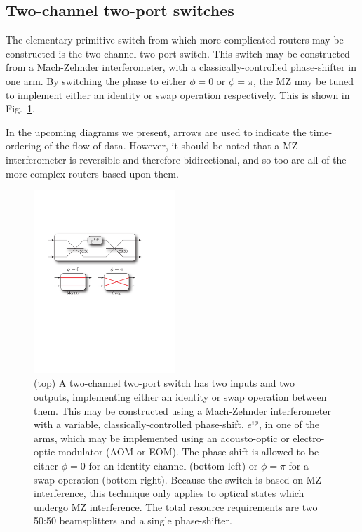 %
%

\subsection{Two-channel two-port switches} 

The elementary primitive switch from which more complicated routers may be constructed is the two-channel two-port switch. This switch may be constructed from a Mach-Zehnder interferometer, with a classically-controlled phase-shifter in one arm. By switching the phase to either \mbox{$\phi=0$} or \mbox{$\phi=\pi$}, the MZ may be tuned to implement either an identity or swap operation respectively. This is shown in Fig.~\ref{fig:two_channel_two_port_switch}.

In the upcoming diagrams we present, arrows are used to indicate the time-ordering of the flow of data. However, it should be noted that a MZ interferometer is reversible and therefore bidirectional, and so too are all of the more complex routers based upon them.

\begin{figure}[!htbp]
\includegraphics[clip=true, width=0.475\textwidth]{two_channel_two_port_switch}
\captionspacefig \caption{(top) A two-channel two-port switch has two inputs and two outputs, implementing either an identity or swap operation between them. This may be constructed using a Mach-Zehnder interferometer with a variable, classically-controlled phase-shift, $e^{i\phi}$, in one of the arms, which may be implemented using an acousto-optic or electro-optic modulator (AOM or EOM). The phase-shift is allowed to be either \mbox{$\phi=0$} for an identity channel (bottom left) or \mbox{$\phi=\pi$} for a swap operation (bottom right). Because the switch is based on MZ interference, this technique only applies to optical states which undergo MZ interference. The total resource requirements are two 50:50 beamsplitters and a single phase-shifter.} \label{fig:two_channel_two_port_switch} 
\end{figure}


